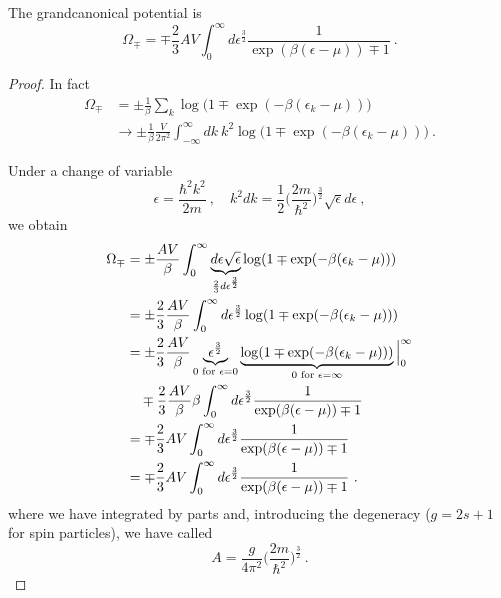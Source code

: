    The grandcanonical potential is 
    \begin{equation*}
        \Omega_\mp = \mp \frac{2}{3}AV \int_0^\infty d \epsilon^{\frac{3}{2}} \frac{1}{\exp(\beta(\epsilon - \mu)) \mp 1}  ~.
    \end{equation*}
    \begin{proof}
        In fact 
        \begin{equation*}
        \begin{aligned}
            \Omega_\mp & = \pm \frac{1}{\beta} \sum_k \log \Big (1 \mp \exp (-\beta (\epsilon_k - \mu)) \Big) \\ & \rightarrow \pm \frac{1}{\beta} \frac{V}{2\pi^2} \int_{-\infty}^\infty dk ~ k^2 \log \Big (1 \mp \exp (-\beta (\epsilon_k - \mu)) \Big) ~.
        \end{aligned}
        \end{equation*}

        Under a change of variable 
        \begin{equation*}
            \epsilon = \frac{\hbar^2 k^2}{2m} ~, \quad k^2 dk = \frac{1}{2} \Big (\frac{2m}{\hbar^2}\Big)^{\frac{3}{2}} \sqrt{\epsilon} d\epsilon ~,
        \end{equation*}
        we obtain 
        \begin{equation*}
        \begin{aligned}
            \Omega_\mp & = \pm \frac{AV}{\beta} \int_0^\infty \underbrace{d\epsilon \sqrt{\epsilon}}_{\frac{2}{3} d \epsilon^{\frac{3}{2}}} \log  (1 \mp \exp (-\beta (\epsilon_k - \mu)) ) \\ & = \pm \frac{2}{3} \frac{AV}{\beta} \int_0^\infty d \epsilon^{\frac{3}{2}} \log  (1 \mp \exp (-\beta (\epsilon_k - \mu)) ) \\ & = \pm \frac{2}{3} \frac{AV}{\beta} \underbrace{\epsilon^{\frac{3}{2}}}_{0 \textnormal{ for } \epsilon = 0} \underbrace{\log  (1 \mp \exp (-\beta (\epsilon_k - \mu)))}_{0 \textnormal{ for } \epsilon = \infty} \Big \vert_0^\infty \\ & \quad \mp \frac{2}{3} \frac{AV}{\beta} \beta \int_0^\infty d \epsilon^{\frac{3}{2}} \frac{1}{\exp(\beta(\epsilon - \mu)) \mp 1} \\ & = \mp \frac{2}{3}AV \int_0^\infty d \epsilon^{\frac{3}{2}} \frac{1}{\exp(\beta(\epsilon - \mu)) \mp 1} \\ & = \mp \frac{2}{3} AV \int_0^\infty d \epsilon^{\frac{3}{2}} \frac{1}{\exp(\beta(\epsilon - \mu)) \mp 1} ~.
        \end{aligned}
        \end{equation*}
        where we have integrated by parts and, introducing the degeneracy ($g = 2s+1$ for spin particles), we have called 
        \begin{equation*}
            A = \frac{g}{4\pi^2} \Big (\frac{2m}{\hbar^2}\Big)^{\frac{3}{2}} ~. 
        \end{equation*}
    \end{proof}


